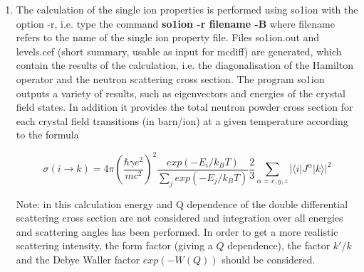\begin{enumerate} 
\item
The calculation of the single ion properties is 
performed using {\prg so1ion} with the option {\prg -r}, 
i.e. type the command {\bf so1ion -r filename -B} where filename
refers to the name of the single ion property file.
Files
{\prg so1ion.out} and {\prg levels.cef} (short summary, usable as input for
{\prg mcdiff}) are generated, which contain the results of the calculation, i.e.
the diagonalisation of the Hamilton operator and the neutron scattering cross section.
The program {\prg so1ion} outputs a variety of results, such as eigenvectors and 
energies of the crystal field states. In addition it provides 
the total neutron powder cross section for each crystal field
transitions (in barn/ion) at a given temperature according to the formula

\begin{equation}
\sigma(i\rightarrow k)=4\pi \left(\frac{\hbar \gamma e^2}{mc^2}\right)^2
\frac{exp(-E_i/k_BT)}{\sum_j exp(-E_j/k_BT)} \frac{2}{3}\sum_{\alpha=x,y,z}
|\langle i|J^{\alpha}|k\rangle|^2
\end{equation}

Note: in this calculation energy and Q dependence
of the double differential scattering cross section are not considered and
integration over all energies and scattering angles has been performed.
In order to get a more realistic scattering intensity, the
form factor (giving a $Q$ dependence), the
factor $k'/k$ and the Debye Waller factor $exp(-W(Q))$ should be considered.


\end{enumerate}
